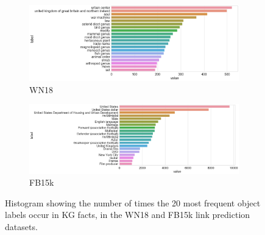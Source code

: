 \begin{figure}
	\begin{subfigure}[b]{.5\linewidth}
   		\centering
    		\includegraphics[width=1.0\linewidth, height=0.7\linewidth]{WN18_Object_Counts}
		\captionsetup{justification=centering}
		\caption{WN18}
	\end{subfigure}
	\begin{subfigure}[b]{.5\linewidth}
   		\centering
		\includegraphics[width=1.0\linewidth, height=0.7\linewidth]{FB15k_Object_Counts}
		\captionsetup{justification=centering}
		\caption{FB15k}
	\end{subfigure}
	\captionsetup{justification=centering}
	\caption{Histogram showing the number of times the 20 most frequent object labels occur in KG facts, in the WN18 and FB15k link prediction datasets.}
\end{figure}

